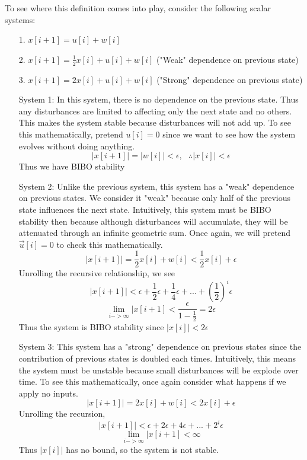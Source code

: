 \documentclass{article}
\begin{document}
To see where this definition comes into play, consider the following scalar systems:
\begin{itemize}
    \item[1.] $x[i+1] = u[i] + w[i]$
    \item[2.] $x[i+1] = \frac{1}{2}x[i] + u[i]+w[i]$ ("Weak" dependence on previous state)
    \item[3.] $x[i+1] = 2 x[i]+u[i]+w[i]$ ("Strong" dependence on previous state)
\end{itemize}
\begin{itemize}
    \item[System 1:] In this system, there is no dependence on the previous state.
    Thus any disturbances are limited to affecting only the next state and no others.
    This makes the system stable because disturbances will not add up.
    To see this mathematically, pretend $u[i] = 0$ since we want to see how the system evolves without doing anything.
    $$|x[i+1]|=|w[i]| < \epsilon, \>\>\> \therefore |x[i]|<\epsilon$$
    Thus we have BIBO stability
    \item[System 2:] Unlike the previous system, this system has a "weak" dependence on previous states. We consider it "weak" because only half of the previous state influences the next state.
    Intuitively, this system must be BIBO stability then because although disturbances will accumulate, they will be attenuated through an infinite geometric sum. Once again, we will pretend $\vec{u}[i]=0$ to check this mathematically.
    $$|x[i+1]| = \frac{1}{2}x[i]+w[i] < \frac{1}{2}x[i]+ \epsilon$$
    Unrolling the recursive relationship, we see
    $$|x[i+1]| < \epsilon+\frac{1}{2}\epsilon+\frac{1}{4}\epsilon+...+\left( \frac{1}{2} \right)^i\epsilon$$
    $$\lim_{i->\infty}{|x[i+1]}<\frac{\epsilon}{1-\frac{1}{2}} = 2\epsilon$$
    Thus the system is BIBO stability since $|x[i]| < 2\epsilon$
    \item[System 3:] This system has a "strong" dependence on previous states since the contribution of previous states is doubled each times.
    Intuitively, this means the system must be unstable because small disturbances will be explode over time. To see this mathematically, once again consider what happens if we apply no inputs.
    $$|x[i+1]| = 2x[i]+w[i] < 2x[i]+ \epsilon$$
    Unrolling the recursion,
    $$|x[i+1]| < \epsilon+2\epsilon+4\epsilon+...+2^i\epsilon$$
    $$\lim_{i->\infty}{|x[i+1]} < \infty$$
    Thus $|x[i]|$ has no bound, so the system is not stable.
\end{itemize}
\end{document}
